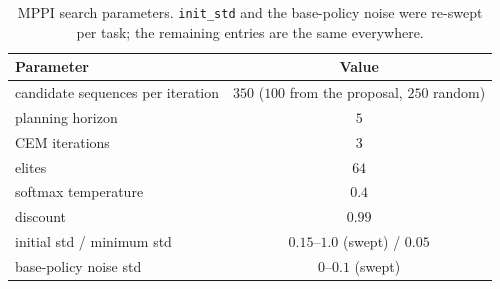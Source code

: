 \begin{table}[h]
\centering
\caption{MPPI search parameters. \texttt{init\_std} and the base-policy noise
were re-swept per task; the remaining entries are the same everywhere.}
\label{tab:app-planner}
\small
\begin{tabular}{lc}
\toprule
Parameter & Value \\
\midrule
candidate sequences per iteration & $350$ ($100$ from the proposal, $250$ random) \\
planning horizon & $5$ \\
CEM iterations & $3$ \\
elites & $64$ \\
softmax temperature & $0.4$ \\
discount & $0.99$ \\
initial std / minimum std & $0.15$--$1.0$ (swept) / $0.05$ \\
base-policy noise std & $0$--$0.1$ (swept) \\
\bottomrule
\end{tabular}
\end{table}

%
